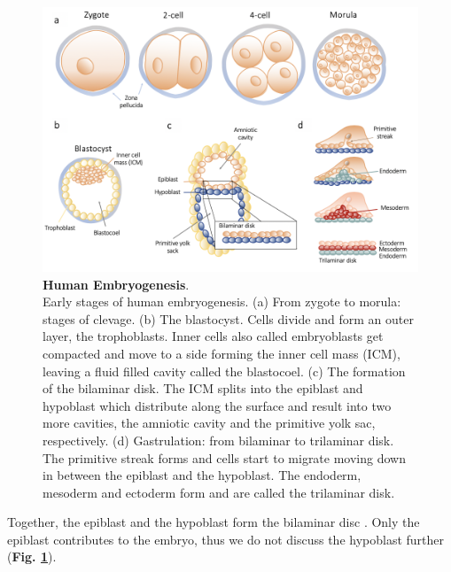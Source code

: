 \begin{figure}[h]
\centering
\includegraphics[width=14.5cm]{Chapter1/Fig/embryogenesis_til_gastrulation.png}
\caption[Human Embryogenesis]{\textbf{Human Embryogenesis}.\\
Early stages of human embryogenesis.
(a) From zygote to morula: stages of clevage.
(b) The blastocyst.
Cells divide and form an outer layer, the trophoblasts.
Inner cells also called embryoblasts get compacted and move to a side forming the inner cell mass (ICM), leaving a fluid filled cavity called the blastocoel.
(c) The formation of the bilaminar disk.
The ICM splits into the epiblast and hypoblast which distribute along the surface and result into two more cavities, the amniotic cavity and the primitive yolk sac, respectively.
(d) Gastrulation: from bilaminar to trilaminar disk.
The primitive streak forms and cells start to migrate moving down in between the epiblast and the hypoblast.
The endoderm, mesoderm and ectoderm form and are called the trilaminar disk.}
\label{fig:embryogenesis}
\end{figure}

Together, the epiblast and the hypoblast form the bilaminar disc \cite{hertig1956description}.
Only the epiblast contributes to the embryo, thus we do not discuss the hypoblast further (\textbf{Fig. \ref{fig:embryogenesis}}).\\

